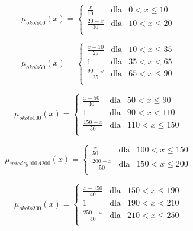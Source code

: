 \documentclass{classrep}
\begin{document}
\begin{equation}
\mu _{okolo10}(x) =  \left\{ \begin{array}{rcl}
\frac{x}{10} & \mbox{dla} & 0 < x \leq 10\\
\frac{20 - x}{10} & \mbox{dla} & 10 < x \leq 20\\
\end{array}\right.
\end{equation}

\begin{equation}
\mu _{okolo50}(x) =  \left\{ \begin{array}{rcl}
\frac{x - 10}{25} & \mbox{dla} & 10 < x \leq 35\\
1 & \mbox{dla} & 35 < x < 65\\
\frac{90 - x}{25} & \mbox{dla} & 65 < x \leq 90\\
\end{array}\right.
\end{equation}

\begin{equation}
\mu _{okolo100}(x) =  \left\{ \begin{array}{rcl}
\frac{x - 50}{40} & \mbox{dla} & 50 < x \leq 90\\
1 & \mbox{dla} & 90 < x < 110\\
\frac{150 - x}{50} & \mbox{dla} & 110 < x \leq 150\\
\end{array}\right.
\end{equation}

\begin{equation}
\mu _{miedzy100A200}(x) =  \left\{ \begin{array}{rcl}
\frac{x}{50} & \mbox{dla} & 100 < x \leq 150\\
\frac{200- x}{50} & \mbox{dla} & 150 < x \leq 200\\
\end{array}\right.
\end{equation}

\begin{equation}
\mu _{okolo200}(x) =  \left\{ \begin{array}{rcl}
\frac{x - 150}{40} & \mbox{dla} & 150 < x \leq 190\\
1 & \mbox{dla} & 190 < x < 210\\
\frac{250 - x}{40} & \mbox{dla} & 210 < x \leq 250\\
\end{array}\right.
\end{equation}
\end{document}
